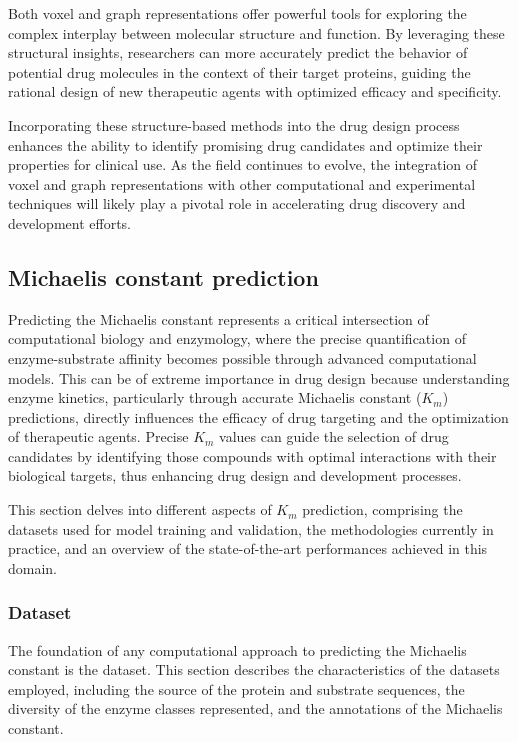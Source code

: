 Both voxel and graph representations offer powerful tools for exploring the complex interplay between molecular structure and function. By leveraging these structural insights, researchers can more accurately predict the behavior of potential drug molecules in the context of their target proteins, guiding the rational design of new therapeutic agents with optimized efficacy and specificity.

Incorporating these structure-based methods into the drug design process enhances the ability to identify promising drug candidates and optimize their properties for clinical use. As the field continues to evolve, the integration of voxel and graph representations with other computational and experimental techniques will likely play a pivotal role in accelerating drug discovery and development efforts.

\subsection{Michaelis constant prediction}

Predicting the Michaelis constant represents a critical intersection of computational biology 
and enzymology, where the precise quantification of enzyme-substrate affinity becomes possible 
through advanced computational models. This can be of extreme importance in drug design because understanding enzyme kinetics, particularly through accurate Michaelis constant ($K_m$) predictions, directly influences the efficacy of drug targeting and the optimization of therapeutic agents. Precise $K_m$ values can guide the selection of drug candidates by identifying those compounds with optimal interactions with their biological targets, thus enhancing drug design and development processes.

This section delves into different aspects of $K_m$ prediction, comprising the datasets used for model training and validation,  the methodologies currently in practice, and an overview of the state-of-the-art performances achieved in this domain. 

\subsubsection{Dataset}
\label{sec:dataset}
The foundation of any computational approach to predicting the Michaelis constant is the dataset. 
This section describes the characteristics of the datasets employed, including the source of the 
protein and substrate sequences, the diversity of the enzyme classes represented, and the annotations of 
the Michaelis constant.

